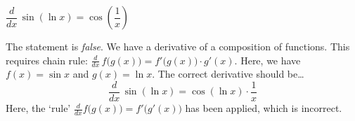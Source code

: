 \documentclass[11pt,letterpaper]{article}
\begin{document}
 $\dfrac{d}{dx} \, \sin(\ln x)= \cos \left( \dfrac{1}{x} \right)$ \pspace

\sol The statement is \textit{false}. We have a derivative of a composition of functions. This requires chain rule: $\frac{d}{dx}\, f \big( g(x) \big)= f' \big( g(x) \big) \cdot g'(x)$. Here, we have $f(x)= \sin x$ and $g(x)= \ln x$. The correct derivative should be\dots
	\[
	\dfrac{d}{dx} \, \sin(\ln x)= \cos(\ln x) \cdot \dfrac{1}{x}
	\]
Here, the `rule' $\frac{d}{dx} f \big( g(x) \big)= f' \big( g'(x) \big)$ has been applied, which is incorrect. \pvspace{1.3cm}



\newpage



%
\end{document}
